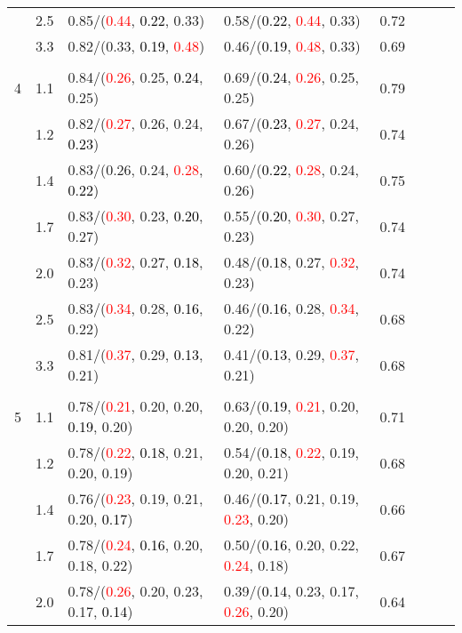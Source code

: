 \documentclass[10pt,a4paper]{report}
\begin{document}
\begin{table}[!htbp]
\begin{center}
{\begin{tabular}{ccllcccc}
			&2.5&0.85/(\textcolor{red}{0.44}, \textcolor{black}{0.22}, 0.33)&0.58/(\textcolor{black}{0.22}, \textcolor{red}{0.44}, 0.33)&0.72\\
			&3.3&0.82/(0.33, \textcolor{black}{0.19}, \textcolor{red}{0.48})&0.46/(\textcolor{black}{0.19}, \textcolor{red}{0.48}, 0.33)&0.69\\
			&&&&\\
			4			&1.1&0.84/(\textcolor{red}{0.26}, 0.25, \textcolor{black}{0.24}, 0.25)&0.69/(\textcolor{black}{0.24}, \textcolor{red}{0.26}, 0.25, 0.25)&0.79\\
			&1.2&0.82/(\textcolor{red}{0.27}, 0.26, 0.24, \textcolor{black}{0.23})&0.67/(\textcolor{black}{0.23}, \textcolor{red}{0.27}, 0.24, 0.26)&0.74\\
			&1.4&0.83/(0.26, 0.24, \textcolor{red}{0.28}, \textcolor{black}{0.22})&0.60/(\textcolor{black}{0.22}, \textcolor{red}{0.28}, 0.24, 0.26)&0.75\\
			&1.7&0.83/(\textcolor{red}{0.30}, 0.23, \textcolor{black}{0.20}, 0.27)&0.55/(\textcolor{black}{0.20}, \textcolor{red}{0.30}, 0.27, 0.23)&0.74\\
			&2.0&0.83/(\textcolor{red}{0.32}, 0.27, \textcolor{black}{0.18}, 0.23)&0.48/(\textcolor{black}{0.18}, 0.27, \textcolor{red}{0.32}, 0.23)&0.74\\
			&2.5&0.83/(\textcolor{red}{0.34}, 0.28, \textcolor{black}{0.16}, 0.22)&0.46/(\textcolor{black}{0.16}, 0.28, \textcolor{red}{0.34}, 0.22)&0.68\\
			&3.3&0.81/(\textcolor{red}{0.37}, 0.29, \textcolor{black}{0.13}, 0.21)&0.41/(\textcolor{black}{0.13}, 0.29, \textcolor{red}{0.37}, 0.21)&0.68\\
			&&&&\\
			5			&1.1&0.78/(\textcolor{red}{0.21}, 0.20, 0.20, \textcolor{black}{0.19}, 0.20)&0.63/(\textcolor{black}{0.19}, \textcolor{red}{0.21}, 0.20, 0.20, 0.20)&0.71\\
			&1.2&0.78/(\textcolor{red}{0.22}, \textcolor{black}{0.18}, 0.21, 0.20, 0.19)&0.54/(\textcolor{black}{0.18}, \textcolor{red}{0.22}, 0.19, 0.20, 0.21)&0.68\\
			&1.4&0.76/(\textcolor{red}{0.23}, 0.19, 0.21, 0.20, \textcolor{black}{0.17})&0.46/(\textcolor{black}{0.17}, 0.21, 0.19, \textcolor{red}{0.23}, 0.20)&0.66\\
			&1.7&0.78/(\textcolor{red}{0.24}, \textcolor{black}{0.16}, 0.20, 0.18, 0.22)&0.50/(\textcolor{black}{0.16}, 0.20, 0.22, \textcolor{red}{0.24}, 0.18)&0.67\\
			&2.0&0.78/(\textcolor{red}{0.26}, 0.20, 0.23, 0.17, \textcolor{black}{0.14})&0.39/(\textcolor{black}{0.14}, 0.23, 0.17, \textcolor{red}{0.26}, 0.20)&0.64\\

\end{tabular}}
\end{center}
\end{table}
\end{document}
